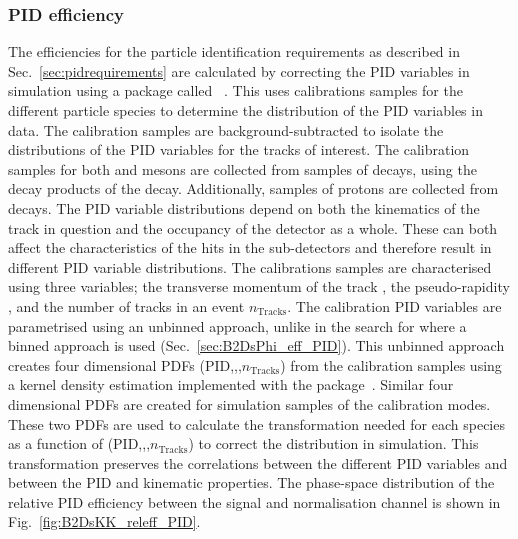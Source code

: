 \subsubsection{PID efficiency}
The efficiencies for the particle identification requirements as described in Sec.~\ref{sec:pidrequirements} are calculated by correcting the PID variables in simulation using a package called \pidcalib~\cite{PIDCalib}. This uses calibrations samples for the different particle species to determine the distribution of the PID variables in data. The calibration samples are background-subtracted to isolate the distributions of the PID variables for the tracks of interest. The calibration samples for both \Kp and \pip mesons are collected from samples of \decay{\Dstarp}{(\decay{\Dz}{\Kp\pim})\pip} decays, using the decay products of the \Dz decay. Additionally, samples of protons are collected from \decay{\PLambda}{\proton\pim} decays. The PID variable distributions depend on both the kinematics of the track in question and the occupancy of the detector as a whole. These can both affect the characteristics of the hits in the \rich sub-detectors and therefore result in different PID variable distributions. The calibrations samples are characterised using three variables; the transverse momentum of the track \pt, the pseudo-rapidity \Peta, and the number of tracks in an event $n_{\text{Tracks}}$. 
The calibration PID variables are parametrised using an unbinned approach, unlike in the search for \decay{\Bp}{\Dsp\phiz} where a binned approach is used (Sec.~\ref{sec:B2DsPhi_eff_PID}). This unbinned approach creates four dimensional PDFs (PID,\Peta,\pt,$n_{\text{Tracks}}$) from the calibration samples using a kernel density estimation implemented with the \meerkat package~\cite{Meerkat}. Similar four dimensional PDFs are created for simulation samples of the calibration modes. These two PDFs are used to calculate the transformation needed for each species as a function of (PID,\Peta,\pt,$n_{\text{Tracks}}$) to correct the distribution in simulation. 
This transformation preserves the correlations between the different PID variables and between the PID and kinematic properties. 
The phase-space distribution of the relative PID efficiency between the signal and normalisation channel is shown in Fig.~\ref{fig:B2DsKK_releff_PID}.

